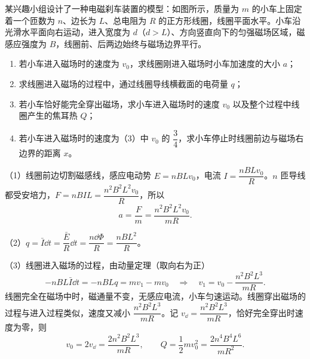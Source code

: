 \begin{liti}
某兴趣小组设计了一种电磁刹车装置的模型：如图所示，质量为 $m$ 的小车上固定着一个匝数为 $n$、边长为 $L$、总电阻为 $R$ 的正方形线圈，线圈平面水平。小车沿光滑水平面向右运动，进入宽度为 $d$（$d>L$）、方向竖直向下的匀强磁场区域，磁感应强度为 $B$，线圈前、后两边始终与磁场边界平行。
\begin{enumerate}[label=（\arabic*）,leftmargin=2.6em]
  \item 若小车进入磁场时的速度为 $v_0$，求线圈刚进入磁场时小车加速度的大小 $a$；
  \item 求线圈进入磁场的过程中，通过线圈导线横截面的电荷量 $q$；
  \item 若小车恰好能完全穿出磁场，求小车进入磁场时的速度 $v_0$ 以及整个过程中线圈产生的焦耳热 $Q$；
  \item 若小车进入磁场时的速度为（3）中 $v_0$ 的 $\dfrac34$，求小车停止时线圈前边与磁场右边界的距离 $x$。
\end{enumerate}
\begin{center}
\end{center}
\begin{jiexi}[8cm]
（1）线圈前边切割磁感线，感应电动势 $E=nBLv_0$，电流 $I=\dfrac{nBLv_0}{R}$。$n$ 匝导线都受安培力，$F=nBIL=\dfrac{n^2B^2L^2v_0}{R}$，所以
\[a=\frac{F}{m}=\frac{n^2B^2L^2v_0}{mR}.\]

（2）$q=\bar{I}\dd t=\dfrac{\bar E}{R}\dd t=\dfrac{n\dd\Phi}{R}=\dfrac{nBL^2}{R}$。

（3）线圈进入磁场的过程，由动量定理（取向右为正）
\[-nBL\bar I\dd t=-nBLq=mv_1-mv_0\quad\Longrightarrow\quad v_1=v_0-\frac{n^2B^2L^3}{mR}.\]
线圈完全在磁场中时，磁通量不变，无感应电流，小车匀速运动。线圈穿出磁场的过程与进入过程类似，速度又减小 $\dfrac{n^2B^2L^3}{mR}$。记 $v_{\dd}=\dfrac{n^2B^2L^3}{mR}$，恰好完全穿出时速度为零，则
\[v_0=2v_{\dd}=\frac{2n^2B^2L^3}{mR},\qquad Q=\frac12mv_0^2=\frac{2n^4B^4L^6}{mR^2}.\]


\end{jiexi}
\end{liti}
